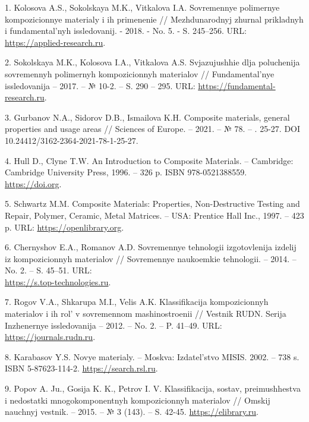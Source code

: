 \begin{references}
1.  Kolosova A.S., Sokolskaya M.K., Vitkalova I.A. Sovremennye
polimernye kompozicionnye materialy i ih primenenie // Mezhdunarodnyj
zhurnal prikladnyh i fundamental'nyh issledovanij. - 2018. - No. 5. -
S. 245–256. URL: \href{https://applied-research.ru/ru/article/view?id=12252&ysclid=m7kors1qru673331574}{https://applied-research.ru}.

2. Sokolskaya M.K., Kolosova I.A., Vitkalova A.S. Svjazujushhie dlja
poluchenija sovremennyh polimer\-nyh kompozicionnyh materialov //
Fundamental'nye issledovanija – 2017. – № 10-2. – S. 290 –
295. URL: \href{https://fundamental-research.ru/ru/article/view?id=41827&ysclid=m7kowxw7wd681574555}{https://fundamental-research.ru}.

3. Gurbanov N.A., Sidorov D.B., Ismailova K.H. Composite materials,
general properties and usage areas // Sciences of Europe. – 2021. – №
78. – . 25-27. DOI 10.24412/3162-2364-2021-78-1-25-27.

4. Hull D., Clyne T.W. An Introduction to Composite Materials. –
Cambridge: Cambridge University Press, 1996. – 326 p. ISBN
978-0521388559. \href{https://doi.org/10.1017/CBO9781139170130}{https://doi.org}.

5. Schwartz M.M. Composite Materials: Properties, Non-Destructive
Testing and Repair, Polymer, Cera\-mic, Metal Matrices. – USA: Prentice
Hall Inc., 1997. – 423
p. URL: \href{https://openlibrary.org/books/OL990224M/Composite_materials}{https://openlibrary.org}.

6. Chernyshov E.A., Romanov A.D. Sovremennye tehnologii izgotovlenija
izdelij iz kompozicionnyh materialov // Sovremennye naukoemkie
tehnologii. – 2014. – No. 2. –
S. 45–51. URL: \\\href{https://s.top-technologies.ru/pdf/2014/2/33649.pdf}{https://s.top-technologies.ru}.

7. Rogov V.A., Shkarupa M.I., Velis A.K. Klassifikacija kompozicionnyh
materialov i ih rol' v sovremen\-nom mashinostroenii // Vestnik
RUDN. Serija Inzhenernye issledovanija – 2012. – No. 2. –
P. 41–49. URL: \href{https://journals.rudn.ru/engineering-researches/article/view/4839?ysclid=m6j2ggf0is563072114}{https://journals.rudn.ru}.

8. Karabasov Y.S. Novye materialy. – Moskva: Izdatel'stvo
MISIS. 2002. – 738 s. ISBN
5-87623-114-2. \href{https://search.rsl.ru/ru/record/01001838887?ysclid=m87kojnf2s394686147}{https://search.rsl.ru}.

9. Popov A. Ju., Gosija K. K., Petrov I. V. Klassifikacija, sostav,
preimushhestva i nedostatki mnogokomp\-onentnyh kompozicionnyh
materialov // Omskij nauchnyj vestnik. – 2015. – № 3 (143). –
S. 42-45. \href{https://elibrary.ru/vcntut?ysclid=m6j2mhco63336644284}{https://elibrary.ru}.


\end{references}
